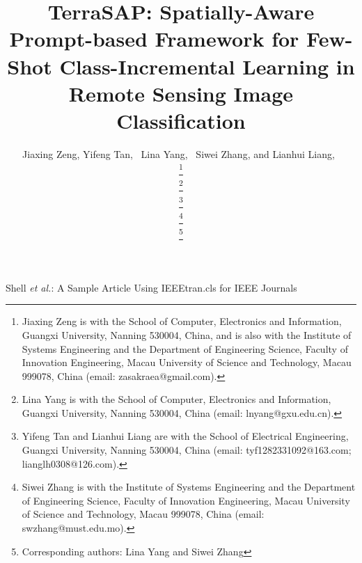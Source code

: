 ﻿\documentclass[letterpaper,journal]{IEEEtran}
\begin{document}
\title{TerraSAP: Spatially-Aware Prompt-based Framework for Few-Shot Class-Incremental Learning in Remote Sensing Image Classification}


\author{
    Jiaxing Zeng,
    Yifeng Tan,~
    Lina Yang,~
    Siwei Zhang,
    and Lianhui Liang,~



\thanks{Jiaxing Zeng is with the School of Computer, Electronics and Information, Guangxi University, Nanning 530004, China, and is also with the Institute of Systems Engineering and the Department of Engineering Science, Faculty of Innovation Engineering, Macau University of Science and Technology, Macau 999078, China (email: zasakraea@gmail.com).}

\thanks{Lina Yang is with the School of Computer, Electronics and Information, Guangxi University, Nanning 530004, China (email: lnyang@gxu.edu.cn).}

\thanks{Yifeng Tan and Lianhui Liang are with the School of Electrical Engineering, Guangxi University, Nanning 530004, China (email: tyf1282331092@163.com; lianglh0308@126.com).}

\thanks{Siwei Zhang is with the Institute of Systems Engineering and the Department of Engineering Science, Faculty of Innovation Engineering, Macau University of Science and Technology, Macau 999078, China (email: swzhang@must.edu.mo).}

\thanks{Corresponding authors: Lina Yang and Siwei Zhang}
}


\markboth{}%
{Shell \MakeLowercase{\textit{et al.}}: A Sample Article Using IEEEtran.cls for IEEE Journals}

\maketitle
\end{document}
